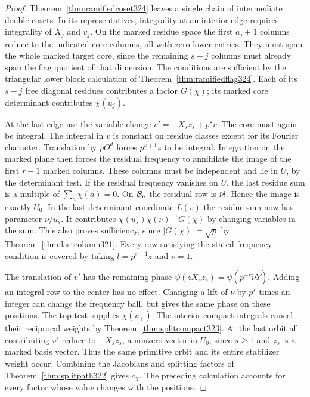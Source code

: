 \documentclass[a4paper,11pt]{article}
\theoremstyle{definition}
\theoremstyle{remark}
\numberwithin{equation}{section}
\begin{document}
\begin{proof}
Theorem~\ref{thm:ramifiedcoset324} leaves a single chain of
intermediate double cosets. In its representatives, integrality at
an interior edge requires integrality of \(X_j\) and \(v_j\).
On the marked residue space the first \(a_j+1\) columns reduce to
the indicated core columns, all with zero lower entries. They must
span the whole marked target core, since the remaining \(s-j\)
columns must already span the flag quotient of that dimension.
The conditions are sufficient by the triangular lower block
calculation of Theorem~\ref{thm:ramifiedflag324}. Each of its
\(s-j\) free diagonal residues contributes a factor \(G(\chi)\);
its marked core determinant contributes \(\chi(u_j)\).

At the last edge use the variable change \(v'=-X_sz_s+p^s v\).
The core must again be integral. The integral in \(v\) is constant
on residue classes except for its Fourier character. Translation
by \(pO^d\) forces \(p^{s+1}z\) to be integral. Integration on
the marked plane then forces the residual frequency to annihilate
the image of the first \(r-1\) marked columns. These columns must be
independent and lie in \(U\), by the determinant test. If the
residual frequency vanishes on \(U\), the last residue sum is a
multiple of \(\sum_a\chi(a)=0\). On \({\cal B}_\nu\) the residual
row is \(\bar\nu\bar l\). Hence the image is exactly \(U_0\).
In the last determinant coordinate \(L(v)\) the residue sum now
has parameter \(\bar\nu/u_s\). It contributes
\(\chi(u_s)\chi(\bar\nu)^{-1}G(\chi)\) by changing variables in
the sum. This also proves sufficiency, since \(|G(\chi)|=\sqrt p\)
by Theorem~\ref{thm:lastcolumn321}. Every row satisfying the stated
frequency condition is covered by taking \(l=p^{s+1}z\) and \(\nu=1\).

The translation of \(v'\) has the remaining phase
\(\psi(zX_sz_s)=\psi(p^{-s}\widetilde\nu\widetilde Y)\).
Adding an integral row to the center has no effect. Changing a lift
of \(\nu\) by \(p^s\) times an integer can change the frequency ball,
but gives the same phase on these positions. The top test supplies
\(\chi(u_+)\). The interior compact integrals cancel their reciprocal
weights by Theorem~\ref{thm:splitcompact323}. At the last orbit all
contributing \(v'\) reduce to \(-\bar X_sz_s\), a nonzero vector in
\(U_0\), since \(s\ge1\) and \(z_s\) is a marked basis vector. Thus
the same primitive orbit and its entire stabilizer weight occur.
Combining the Jacobians and splitting factors of
Theorem~\ref{thm:splitpath322} gives \(c_\chi\). The preceding
calculation accounts for every factor whose value changes with
the positions.


\end{proof}
\end{document}
